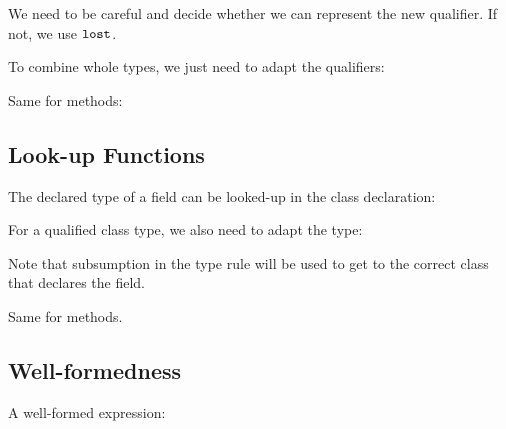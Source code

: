 We need to be careful and decide whether we can represent the new
qualifier. If not, we use $ \texttt{\upshape{lost}\,\!} $.

\vspace{0.5ex}
\ottdefnqcombqrules{}
\vspace{2.0ex}


To combine whole types, we just need to adapt the qualifiers:

\vspace{0.5ex}
\ottdefnqcombtrules{}
\vspace{2.0ex}


Same for methods:

\vspace{0.5ex}
\ottdefnqcombmsrules{}
\vspace{2.0ex}



\subsection{Look-up Functions}

The declared type of a field can be looked-up in the class
declaration:

\vspace{0.5ex}
\ottdefnsftypec{}
\vspace{2.0ex}


For a qualified class type, we also need to adapt the type:

\vspace{0.5ex}
\ottdefnsftypet{}
\vspace{2.0ex}


Note that subsumption in the type rule will be used to get to the
correct class that declares the field.

Same for methods.

\vspace{0.5ex}
\ottdefnsmsigc{}
\vspace{2.0ex}


\vspace{0.5ex}
\ottdefnsmsigt{}
\vspace{2.0ex}


\subsection{Well-formedness}

A well-formed expression:

\vspace{0.5ex}
\ottdefntyperules{}
\vspace{2.0ex}


